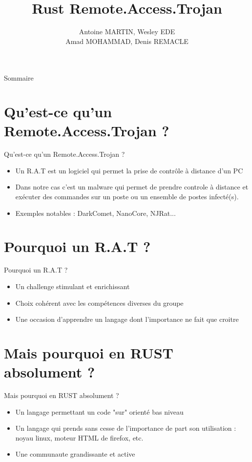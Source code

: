 \documentclass{beamer}
\title{Rust Remote.Access.Trojan}
\author{Antoine MARTIN, Wesley EDE\\Amad MOHAMMAD, Denis REMACLE}
\begin{document}
  \begin{frame}
 \maketitle
  \end{frame}

\begin{frame}{Sommaire}
    \tableofcontents
\end{frame}

\section{Qu'est-ce qu'un Remote.Access.Trojan ?}
  \begin{frame}{Qu'est-ce qu'un Remote.Access.Trojan ?}
  \begin{itemize}
	\item Un R.A.T est un logiciel qui permet la prise de contrôle à distance d'un PC
	\item Dans notre cas c'est un malware qui permet de prendre controle à distance et exécuter des commandes sur un poste ou un ensemble de postes infecté(s).
	\item Exemples notables : DarkComet, NanoCore, NJRat...
  \end{itemize}
  \end{frame}

\section{Pourquoi un R.A.T ?}
  \begin{frame}{Pourquoi un R.A.T ?}
  \begin{itemize}
	\item Un challenge stimulant et enrichissant
	\item Choix cohérent avec les compétences diverses du groupe
	\item Une occasion d'apprendre un langage dont l'importance ne fait que croitre
  \end{itemize}
  \end{frame}



\section{Mais pourquoi en RUST absolument ?}
  \begin{frame}{Mais pourquoi en RUST absolument ?}
  \begin{itemize}
	\item Un langage permettant un code "sur" orienté bas niveau
	\item Un langage qui prends sans cesse de l'importance de part son utilisation : noyau linux, moteur HTML de firefox, etc.
	\item Une communaute grandissante et active
  \end{itemize}
  \end{frame}
\end{document}
